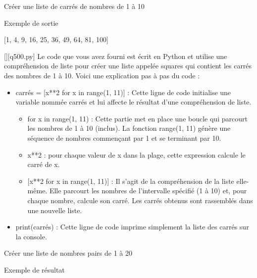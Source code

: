 \renewcommand{\chemincode}{../../code/}
        \question
        Créer une liste de carrés de nombres de 1 à 10

Exemple de sortie

[1, 4, 9, 16, 25, 36, 49, 64, 81, 100]
        \par
        \begin{solution}
            \renewcommand{\nomfichier}{q500.py}
            \pythonfile{\chemincode \nomfichier}[][\nomfichier]
            Le code que vous avez fourni est écrit en Python et utilise une compréhension de liste pour créer une liste appelée squares qui contient les carrés des nombres de 1 à 10. Voici une explication pas à pas du code :\par

\begin{itemize}
\item     carrés = [x**2 for x in range(1, 11)] : Cette ligne de code initialise une variable nommée carrés et lui affecte le résultat d'une compréhension de liste.

\begin{itemize}
\item         for x in range(1, 11) : Cette partie met en place une boucle qui parcourt les nombres de 1 à 10 (inclus). La fonction range(1, 11) génère une séquence de nombres commençant par 1 et se terminant par 10.
\item         x**2 : pour chaque valeur de x dans la plage, cette expression calcule le carré de x.
\item{}    [x**2 for x in range(1, 11)]  : Il s'agit de la compréhension de la liste elle-même. Elle parcourt les nombres de l'intervalle spécifié (1 à 10) et, pour chaque nombre, calcule son carré. Les carrés obtenus sont rassemblés dans une nouvelle liste.
\end{itemize}
    \item print(carrés) : Cette ligne de code imprime simplement la liste des carrés sur la console.
\end{itemize}
        \end{solution}
        

        \question
        Créer une liste de nombres pairs de 1 à 20

Exemple de résultat

